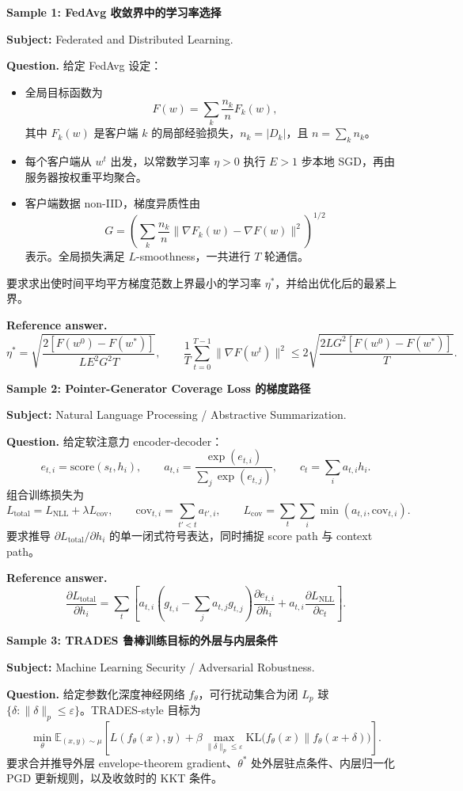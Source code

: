 \documentclass[11pt]{ctexart}
\newcommand{\tightparagraph}[1]{\vspace{0.4em}\noindent\textbf{#1}}
\begin{document}
\tightparagraph{Sample 1: FedAvg 收敛界中的学习率选择}

\textbf{Subject:} Federated and Distributed Learning.

\textbf{Question.} 给定 FedAvg 设定：
\begin{itemize}
  \item 全局目标函数为
  \[
  F(w)=\sum_k \frac{n_k}{n}F_k(w),
  \]
  其中 $F_k(w)$ 是客户端 $k$ 的局部经验损失，$n_k=|D_k|$，且 $n=\sum_k n_k$。
  \item 每个客户端从 $w^t$ 出发，以常数学习率 $\eta>0$ 执行 $E>1$ 步本地 SGD，再由服务器按权重平均聚合。
  \item 客户端数据 non-IID，梯度异质性由
  \[
  G=\left(\sum_k \frac{n_k}{n}\|\nabla F_k(w)-\nabla F(w)\|^2\right)^{1/2}
  \]
  表示。全局损失满足 $L$-smoothness，一共进行 $T$ 轮通信。
\end{itemize}
要求求出使时间平均平方梯度范数上界最小的学习率 $\eta^\ast$，并给出优化后的最紧上界。

\textbf{Reference answer.}
\[
\eta^\ast=
\sqrt{\frac{2[F(w^0)-F(w^\ast)]}{L E^2G^2T}},
\qquad
\frac{1}{T}\sum_{t=0}^{T-1}\|\nabla F(w^t)\|^2
\leq
2\sqrt{\frac{2LG^2[F(w^0)-F(w^\ast)]}{T}}.
\]

\tightparagraph{Sample 2: Pointer-Generator Coverage Loss 的梯度路径}

\textbf{Subject:} Natural Language Processing / Abstractive Summarization.

\textbf{Question.} 给定软注意力 encoder-decoder：
\[
e_{t,i}=\mathrm{score}(s_t,h_i),\qquad
a_{t,i}=\frac{\exp(e_{t,i})}{\sum_j\exp(e_{t,j})},\qquad
c_t=\sum_i a_{t,i}h_i.
\]
组合训练损失为
\[
L_{\mathrm{total}}=L_{\mathrm{NLL}}+\lambda L_{\mathrm{cov}},\qquad
\mathrm{cov}_{t,i}=\sum_{t'<t}a_{t',i},\qquad
L_{\mathrm{cov}}=\sum_t\sum_i\min(a_{t,i},\mathrm{cov}_{t,i}).
\]
要求推导 $\partial L_{\mathrm{total}}/\partial h_i$ 的单一闭式符号表达，同时捕捉 score path 与 context path。

\textbf{Reference answer.}
\[
\frac{\partial L_{\mathrm{total}}}{\partial h_i}
=
\sum_t
\left[
a_{t,i}\left(g_{t,i}-\sum_j a_{t,j}g_{t,j}\right)
\frac{\partial e_{t,i}}{\partial h_i}
+
a_{t,i}\frac{\partial L_{\mathrm{NLL}}}{\partial c_t}
\right].
\]

\tightparagraph{Sample 3: TRADES 鲁棒训练目标的外层与内层条件}

\textbf{Subject:} Machine Learning Security / Adversarial Robustness.

\textbf{Question.} 给定参数化深度神经网络 $f_\theta$，可行扰动集合为闭 $L_p$ 球 $\{\delta:\|\delta\|_p\leq\varepsilon\}$。TRADES-style 目标为
\[
\min_{\theta}
\mathbb{E}_{(x,y)\sim\mu}
\left[
L(f_\theta(x),y)
+
\beta\max_{\|\delta\|_p\leq\varepsilon}
\mathrm{KL}\bigl(f_\theta(x)\|f_\theta(x+\delta)\bigr)
\right].
\]
要求合并推导外层 envelope-theorem gradient、$\theta^\ast$ 处外层驻点条件、内层归一化 PGD 更新规则，以及收敛时的 KKT 条件。
\end{document}
